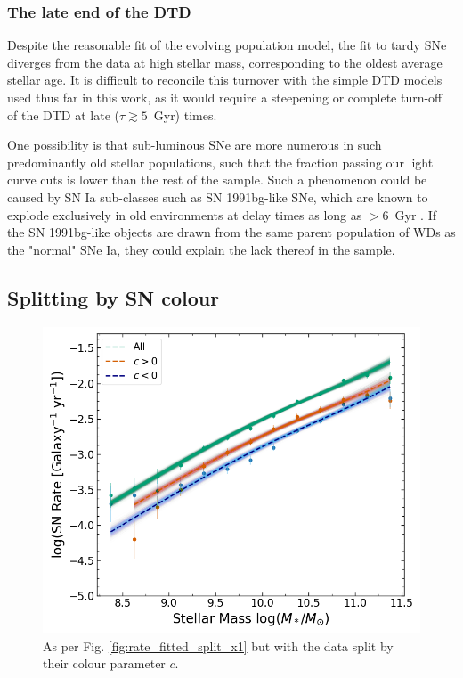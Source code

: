 \documentclass[fleqn,usenatbib]{mnras}
\begin{document}
\subsubsection{The late end of the DTD \label{subsubsec:subtypes}}

Despite the reasonable fit of the evolving population model, the fit to tardy SNe diverges from the data at high stellar mass, corresponding to the oldest average stellar age. It is difficult to reconcile this turnover with the simple DTD models used thus far in this work, as it would require a steepening or complete turn-off of the DTD at late ($\tau\gtrsim 5$~Gyr) times.

One possibility is that sub-luminous SNe are more numerous in such predominantly old stellar populations, such that the fraction passing our light curve cuts is lower than the rest of the sample. Such a phenomenon could be caused by SN Ia sub-classes such as SN 1991bg-like SNe, which are known to explode exclusively in old environments \citep{Perets2010} at delay times as long as $>6$~Gyr \citep{Panther2019}. If the SN 1991bg-like objects are drawn from the same parent population of WDs as the "normal" SNe Ia, they could explain the lack thereof in the sample.

\subsection{Splitting by SN colour \label{subsec:split_c}}
\begin{figure}
    \centering
    \includegraphics[width=.5\textwidth]{figs/rate_vs_mass_DTD_fit_beta_norm_Qerf1.1_split_c.png}
    \caption{As per Fig. \ref{fig:rate_fitted_split_x1} but with the data split by their colour parameter $c$.%
    \label{fig:rate_fitted_split_c}}
\end{figure}
\end{document}
